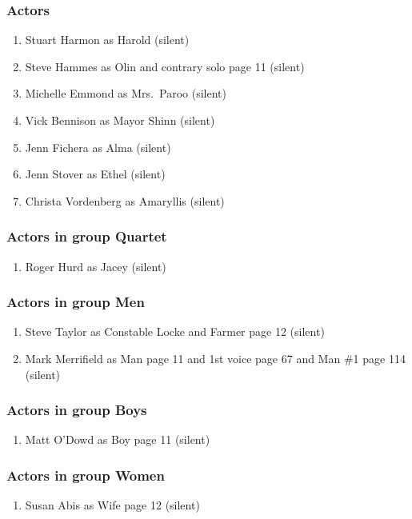\subsubsection{Actors}
\begin{enumerate}
\item Stuart Harmon as Harold (silent)
\item Steve Hammes as Olin and contrary solo page 11 (silent)
\item Michelle Emmond as Mrs.~Paroo (silent)
\item Vick Bennison as Mayor Shinn (silent)
\item Jenn Fichera as Alma (silent)
\item Jenn Stover as Ethel (silent)
\item Christa Vordenberg as Amaryllis (silent)
\end{enumerate}
\subsubsection{Actors in group Quartet}
\begin{enumerate}
\item Roger Hurd as Jacey (silent)
\end{enumerate}
\subsubsection{Actors in group Men}
\begin{enumerate}
\item Steve Taylor as Constable Locke and Farmer page 12 (silent)
\item Mark Merrifield as Man page 11 and 1st voice page 67 and Man \#1 page 114 (silent)
\end{enumerate}
\subsubsection{Actors in group Boys}
\begin{enumerate}
\item Matt O'Dowd as Boy page 11 (silent)
\end{enumerate}
\subsubsection{Actors in group Women}
\begin{enumerate}
\item Susan Abis as Wife page 12 (silent)
\end{enumerate}

